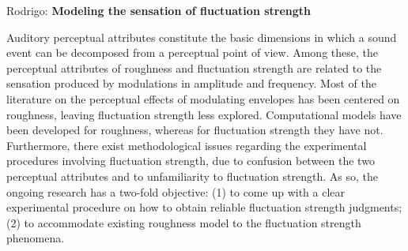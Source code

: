 \documentclass{report}
\begin{document}
Rodrigo: \textbf{Modeling the sensation of fluctuation strength}

Auditory perceptual attributes constitute the basic dimensions in which a sound
event can be decomposed from a perceptual point of view. Among these, the
perceptual attributes of roughness and fluctuation strength are related to the
sensation produced by modulations in amplitude and frequency. Most of the
literature on the perceptual effects of modulating envelopes has been centered
on roughness, leaving fluctuation strength less explored. Computational models
have been developed for roughness, whereas for fluctuation strength they have
not. Furthermore, there exist methodological issues regarding the experimental
procedures involving fluctuation strength, due to confusion between the two
perceptual attributes and to unfamiliarity to fluctuation strength. As so, the
ongoing research has a two-fold objective: (1) to come up with a clear
experimental procedure on how to obtain reliable fluctuation strength judgments;
(2) to accommodate existing roughness model to the fluctuation strength
phenomena.
\end{document}
